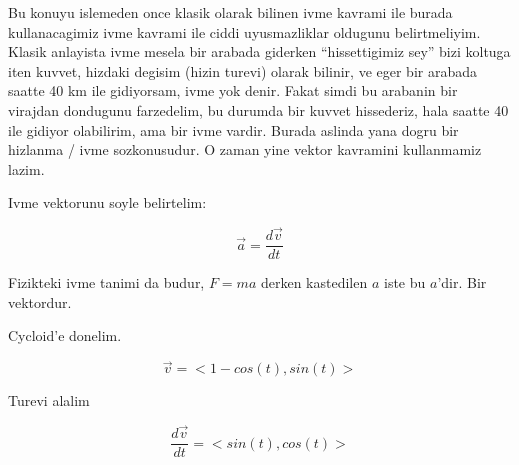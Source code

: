 \documentclass[12pt,fleqn]{article}
\begin{document}
Bu konuyu islemeden once klasik olarak bilinen ivme kavrami ile burada
kullanacagimiz ivme kavrami ile ciddi uyusmazliklar oldugunu
belirtmeliyim. Klasik anlayista ivme mesela bir arabada giderken
``hissettigimiz sey'' bizi koltuga iten kuvvet, hizdaki degisim (hizin
turevi) olarak bilinir, ve eger bir arabada saatte 40 km ile gidiyorsam,
ivme yok denir. Fakat simdi bu arabanin bir virajdan dondugunu farzedelim,
bu durumda bir kuvvet hissederiz, hala saatte 40 ile gidiyor olabilirim,
ama bir ivme vardir. Burada aslinda yana dogru bir hizlanma / ivme
sozkonusudur. O zaman yine vektor kavramini kullanmamiz lazim. 

Ivme vektorunu soyle belirtelim:

\[ \vec{a} = \frac{d\vec{v}}{dt} \]

Fizikteki ivme tanimi da budur, $F = ma$ derken kastedilen $a$ iste bu
$a$'dir. Bir vektordur. 

Cycloid'e donelim. 

\[ \vec{v} = <1-cos(t),sin(t)>\]

Turevi alalim

\[ \frac{d\vec{v}}{dt} = <sin(t), cos(t)>\]
\end{document}
